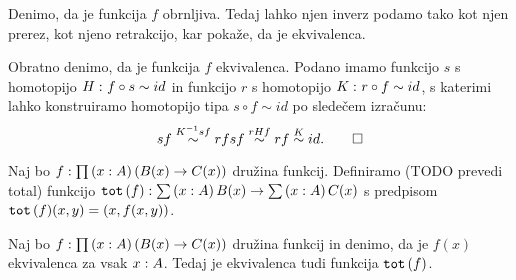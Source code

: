 \begin{dokaz}
  Denimo, da je funkcija \(f\) obrnljiva. Tedaj lahko njen inverz podamo tako kot njen
  prerez, kot njeno retrakcijo, kar pokaže, da je ekvivalenca.

  Obratno denimo, da je funkcija \(f\) ekvivalenca. Podano imamo funkcijo \(s\) s
  homotopijo \(H \,\colon f \circ s \sim id\) in funkcijo \(r\) s homotopijo
  \(K \,\colon r \circ f \sim id\), s katerimi lahko konstruiramo homotopijo tipa
  \(s \circ f \sim id\) po sledečem izračunu:
  \[s f \overset{K^{-1}sf}{\sim} r f s f \overset{rHf}{\sim} r f \overset{K}{\sim} id. \qedhere\]
\end{dokaz}

\begin{comment}
\begin{definicija}
  Naj bo \(\defun{f}{A}{B}\) funkcija in \(\typejudgment{b}{B}\). Tip
  \[\fib{f}{b} := \sumtype{x}{A}{f(x) = b}\]
  imenujemo \emph{vlakno funkcije f pri točki b}.
\end{definicija}

\begin{trditev}
  Funkcija \(f\) je obrnljiva natanko tedaj, ko je vlakno funkcije \(f\) pri \(y\)
  kontraktibilno za vsak \(\typejudgment{y}{B}\).
\end{trditev}

\begin{dokaz}
  Denimo najprej, da je funkcija \(\defun{f}{A}{B}\) obrnljiva in naj bo
  \(\typejudgment{y}{B}\). Dokazati želimo, da je tip
  \(\fib{f}{y} = \sumtype{x}{A}{fx = y}\)
  kontraktibilen. Ker je funkcija \(f\) obrnljiva, obstaja funkcija \(\defun{g}{B}{A}\)
  in homotopija \(\homotopy{H}{f \circ g}{id}\), zato lahko za center kontrakcije
  tipa \(\fib{f}{y}\) izberemo element \(\left(g(y), H(y)\right)\). Da bi konstruirali
\end{dokaz}
\end{comment}

\begin{definicija}
  Naj bo \(f : \prod \left( x : A \right) \left(B(x) \to C(x)\right)\) družina funkcij.
  Definiramo (TODO prevedi total) funkcijo
  \(\textnormal{\texttt{tot}}\,(f) : \sum \left( x : A \right) B(x) \to \sum \left( x : A \right) C(x)\) s predpisom
  \(\textnormal{\texttt{tot}}\,(f)(x, y) = (x, f(x, y))\).
\end{definicija}

\begin{izrek}
  Naj bo \(f : \prod \left( x : A \right) \left(B(x) \to C(x)\right)\) družina funkcij
  in denimo, da je \(f(x)\) ekvivalenca za vsak \(x : A\). Tedaj je
  ekvivalenca tudi funkcija \(\textnormal{\texttt{tot}}\,(f)\).
\end{izrek}


